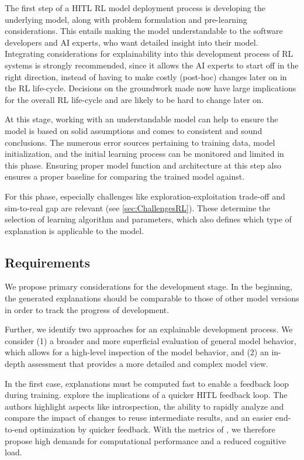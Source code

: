\documentclass[twoside,11pt]{article}
\begin{document}
\begin{enumerate}
The first step of a HITL RL model deployment process is developing the underlying model, along with problem formulation and pre-learning considerations. This entails making the model understandable to the software developers and AI experts, who want detailed insight into their model. 
Integrating considerations for explainability into this development process of RL systems is strongly recommended, since it allows the AI experts to start off in the right direction, instead of having to make costly (post-hoc) changes later on in the RL life-cycle. Decisions on the groundwork made now have large implications for the overall RL life-cycle and are likely to be hard to change later on.

At this stage, working with an understandable model can help to ensure the model is based on solid assumptions and comes to consistent and sound conclusions. The numerous error sources pertaining to training data, model initialization, and the initial learning process can be monitored and limited in this phase. Ensuring proper model function and architecture at this step also ensures a proper baseline for comparing the trained model against.

For this phase, especially challenges like exploration-exploitation trade-off and sim-to-real gap are relevant (see \ref{sec:ChallengesRL}). These determine the selection of learning algorithm and parameters, which also defines which type of explanation is applicable to the model.

\subsection{Requirements}

We propose primary considerations for the development stage. In the beginning, the generated explanations should be comparable to those of other model versions in order to track the progress of development. 

Further, we identify two approaches for an explainable development process. We consider (1) a broader and more superficial evaluation of general model behavior, which allows for a high-level inspection of the model behavior, and (2) an in-depth assessment that provides a more detailed and complex model view.

In the first case, explanations must be computed fast to enable a feedback loop during training. \citet{XinEtAl:2018:HITLMLFeedbackLoop} explore the implications of a quicker HITL feedback loop. The authors highlight aspects like introspection, the ability to rapidly analyze and compare the impact of changes to reuse intermediate results, and an easier end-to-end optimization by quicker feedback. With the metrics of \citet{milani2022survey}, we therefore  propose high demands for computational performance and a reduced cognitive load.


\end{enumerate}
\end{document}
